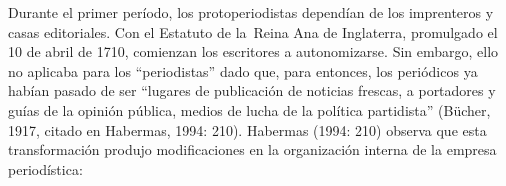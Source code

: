 %

Durante el primer período, los protoperiodistas dependían de los imprenteros y casas editoriales. Con el Estatuto de la~Reina Ana de Inglaterra, promulgado el 10 de abril de 1710, comienzan los escritores a autonomizarse. Sin embargo, ello no aplicaba para los ``periodistas'' dado que, para entonces, los periódicos ya habían pasado de ser ``lugares de publicación de noticias frescas, a portadores y guías de la opinión pública, medios de lucha de la política partidista'' (Bücher, 1917, citado en Habermas, 1994: 210). Habermas (1994: 210) observa que esta transformación produjo modificaciones en la organización interna de la empresa periodística:

